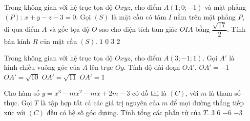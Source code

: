 	\begin{ex}%
	Trong không gian với hệ trục tọa độ $ Oxyz $, cho điểm $A(1;0;-1)$ và mặt phẳng $(P)$: $x+y-z-3=0$. Gọi $(S)$ là mặt cầu có tâm $I$ nằm trên mặt phẳng $ P $, đi qua điểm $A$ và gốc tọa độ $O$ sao cho diện tích tam giác $OIA$ bằng $\dfrac{\sqrt{17}}{2}$. Tính bán kính $R$ của mặt cầu $(S)$.
	\choice
	{$1$}
	{$0$}
	{\True $3$}
	{$2$}
	\end{ex}
	\begin{ex}%
	Trong không gian với hệ trục tọa độ $Oxyz$, cho điểm $A(3;-1;1)$. Gọi ${A}'$ là hình chiếu vuông góc của $A$ lên trục $Oy$. Tính độ dài đoạn $OA'$.
	\choice
	{$OA'=-1$}
	{$OA'=\sqrt{10}$}
	{$OA'=\sqrt{11}$}
	{\True $OA'=1$}
	\end{ex}
	\begin{ex}%
	Cho hàm số $y=x^3-mx^2-mx+2m-3$ có đồ thị là $(C)$, với $m$ là tham số thực. Gọi $T$ là tập hợp tất cả các giá trị nguyên của $m$ để mọi đường thẳng tiếp xúc với $(C)$ đều có hệ số góc dương. Tính tổng các phần tử của $T$.
	\choice
	{$3$}
	{$6$}
	{$-6$}
	{\True $-3$}
	\end{ex}
